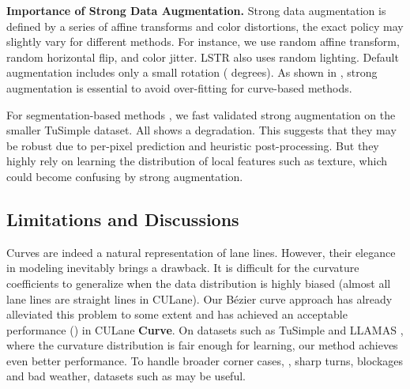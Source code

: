 \documentclass[10pt,twocolumn,letterpaper]{article}
\begin{document}
\begin{table}[ht]
    \centering
    \caption{Augmentation ablations. \textbf{Aug}: Strong data augmentation.}
    \label{tab:ablaug}
    \vspace{-3mm}
\end{table}


\noindent \textbf{Importance of Strong Data Augmentation.} Strong data augmentation is defined by a series of affine transforms and color distortions, the exact policy may slightly vary for different methods. For instance, we use random affine transform, random horizontal flip, and color jitter. LSTR \cite{liu2021end} also uses random lighting. Default augmentation includes only a small rotation ( degrees). As shown in , strong augmentation is essential to avoid over-fitting for curve-based methods.

For segmentation-based methods \cite{deeplabv1,pan2018spatial,zheng2021resa}, we fast validated strong augmentation on the smaller TuSimple \cite{tusimple} dataset. All shows a  degradation. This suggests that they may be robust due to per-pixel prediction and heuristic post-processing. But they highly rely on learning the distribution of local features such as texture, which could become confusing by strong augmentation.

         


\subsection{Limitations and Discussions}
\label{sec:limit}





Curves are indeed a natural representation of lane lines. However, their elegance in modeling inevitably brings a drawback. It is difficult for the curvature coefficients to generalize when the data distribution is highly biased (almost all lane lines are straight lines in CULane). Our Bézier curve approach has already alleviated this problem to some extent and has achieved an acceptable performance () in CULane \textbf{Curve}. On datasets such as TuSimple and LLAMAS \cite{tusimple,llamas2019},
where the curvature distribution is fair enough for learning,
our method achieves even better performance. To handle broader corner cases, \eg, sharp turns, blockages and bad weather, datasets such as \cite{xu2020curvelane,Tan_2021_TIP_NightCity,sakaridis2018semantic} may be useful.
\end{document}
